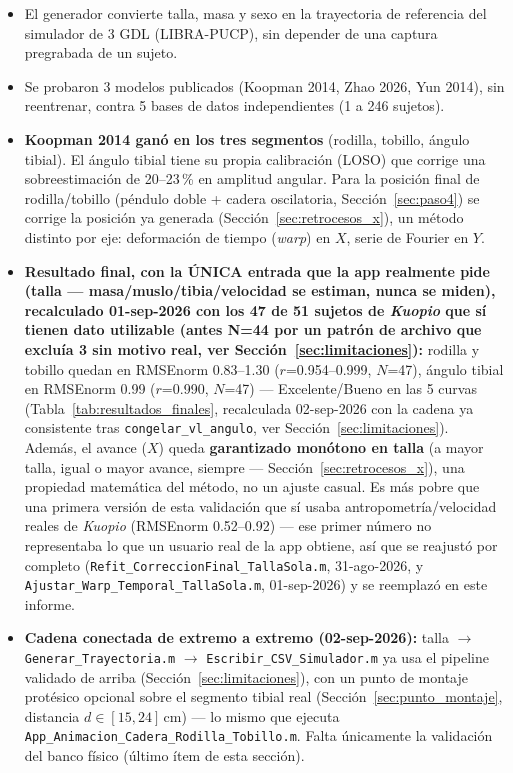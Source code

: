 \documentclass[11pt,a4paper]{scrartcl}
\begin{document}
\begin{itemize}
    \item El generador convierte talla, masa y sexo en la trayectoria de referencia del simulador de 3 GDL (LIBRA-PUCP), sin depender de una captura pregrabada de un sujeto.
    \item Se probaron 3 modelos publicados (Koopman 2014, Zhao 2026, Yun 2014), sin reentrenar, contra 5 bases de datos independientes (1 a 246 sujetos).
    \item \textbf{Koopman 2014 ganó en los tres segmentos} (rodilla, tobillo, ángulo tibial). El ángulo tibial tiene su propia calibración (LOSO) que corrige una sobreestimación de 20--23\,\% en amplitud angular. Para la posición final de rodilla/tobillo (péndulo doble + cadera oscilatoria, Sección~\ref{sec:paso4}) se corrige la posición ya generada (Sección~\ref{sec:retrocesos_x}), un método distinto por eje: deformación de tiempo (\emph{warp}) en $X$, serie de Fourier en $Y$.
    \item \textbf{Resultado final, con la ÚNICA entrada que la app realmente pide (talla --- masa/muslo/tibia/velocidad se estiman, nunca se miden), recalculado 01-sep-2026 con los 47 de 51 sujetos de \emph{Kuopio} que sí tienen dato utilizable (antes N=44 por un patrón de archivo que excluía 3 sin motivo real, ver Sección~\ref{sec:limitaciones}):} rodilla y tobillo quedan en RMSEnorm 0.83--1.30 ($r$=0.954--0.999, $N$=47), ángulo tibial en RMSEnorm 0.99 ($r$=0.990, $N$=47) --- Excelente/Bueno en las 5 curvas (Tabla~\ref{tab:resultados_finales}, recalculada 02-sep-2026 con la cadena ya consistente tras \texttt{congelar\_vl\_angulo}, ver Sección~\ref{sec:limitaciones}). Además, el avance ($X$) queda \textbf{garantizado monótono en talla} (a mayor talla, igual o mayor avance, siempre --- Sección~\ref{sec:retrocesos_x}), una propiedad matemática del método, no un ajuste casual. Es más pobre que una primera versión de esta validación que sí usaba antropometría/velocidad reales de \emph{Kuopio} (RMSEnorm 0.52--0.92) --- ese primer número no representaba lo que un usuario real de la app obtiene, así que se reajustó por completo (\texttt{Refit\_CorreccionFinal\_TallaSola.m}, 31-ago-2026, y \texttt{Ajustar\_Warp\_Temporal\_TallaSola.m}, 01-sep-2026) y se reemplazó en este informe.
    \item \textbf{Cadena conectada de extremo a extremo (02-sep-2026):} talla $\to$ \texttt{Generar\_Trayectoria.m} $\to$ \texttt{Escribir\_CSV\_Simulador.m} ya usa el pipeline validado de arriba (Sección~\ref{sec:limitaciones}), con un punto de montaje protésico opcional sobre el segmento tibial real (Sección~\ref{sec:punto_montaje}, distancia $d\in[15,24]$\,cm) --- lo mismo que ejecuta \texttt{App\_Animacion\_Cadera\_Rodilla\_Tobillo.m}. Falta únicamente la validación del banco físico (último ítem de esta sección).

\end{itemize}
\end{document}

